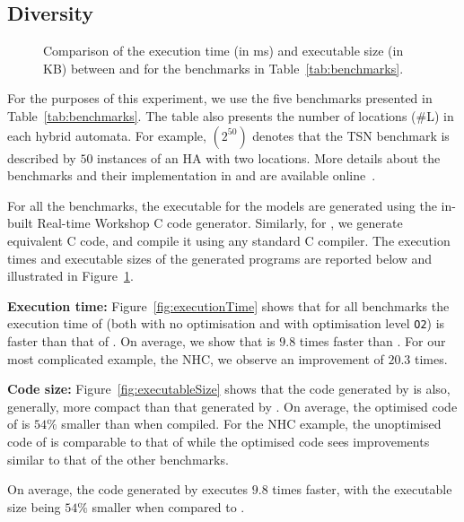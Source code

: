 \subsection{Diversity}

\begin{figure}[htbp]
	\centering
	\caption{Comparison of the execution time (in ms) and executable size (in KB) between \simulink and \ourTool for the benchmarks in Table~\ref{tab:benchmarks}.}
	\label{fig:results}
\end{figure}

For the purposes of this experiment, we use the five benchmarks presented in Table~\ref{tab:benchmarks}.
The table also presents the number of locations (\#L) in each hybrid automata.
For example, $(2^{50})$ denotes that the \acf{TSN} benchmark is described by $50$ instances of an \ac{HA} with two locations.
More details about the benchmarks and their implementation in \ourTool and \simulink are available online~\cite{githubBenchmarks}.

For all the benchmarks, the executable for the \simulink models are generated using the in-built Real-time Workshop\textsuperscript{\textregistered} C code generator.
Similarly, for \ourTool, we generate equivalent C code, and compile it using any standard C compiler.
The execution times and executable sizes of the generated programs are reported below and illustrated in Figure~\ref{fig:results}.

\textbf{Execution time:} 
Figure~\ref{fig:executionTime} shows that for all benchmarks the execution time of \ourTool (both with no optimisation and with optimisation level \texttt{O2}) is faster than that of \simulink.
On average, we show that \ourTool is $9.8$ times faster than \simulink.
For our most complicated example, the \ac{NHC}, we observe an improvement of $20.3$ times.

\textbf{Code size:}
Figure~\ref{fig:executableSize} shows that the code generated by \ourTool is also, generally, more compact than that generated by \simulink.
On average, the optimised code of \ourTool is $54\%$ smaller than \simulink when compiled.
For the \ac{NHC} example, the unoptimised code of \ourTool is comparable to that of \simulink while the optimised code sees improvements similar to that of the other benchmarks.

On average, the code generated by \ourTool executes $9.8$ times faster, with the executable size being $54\%$ smaller when compared to \simulink.
\



